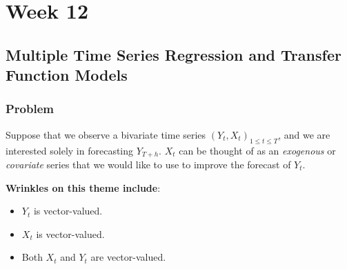 \chapter{Week 12}
\section{Multiple Time Series Regression and Transfer Function Models}
\subsection*{Problem}
Suppose that we observe a bivariate time series $ (Y_t,X_t)_{1\le t\le T} $,
and we are interested solely in forecasting $ Y_{T+h} $. $ X_t $
can be thought of as an \emph{exogenous} or \emph{covariate} series that
we would like to use to improve the forecast of $ Y_t $.

\textbf{Wrinkles on this theme include}:
\begin{itemize}
    \item $ Y_t $ is vector-valued.
    \item $ X_t $ is vector-valued.
    \item Both $ X_t $ and $ Y_t $ are vector-valued.
\end{itemize}

